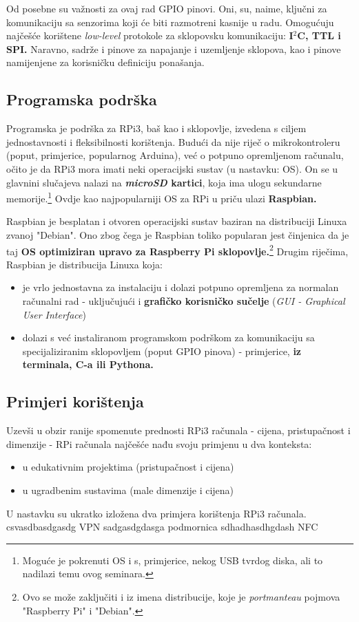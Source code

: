 \documentclass[12pt,a4paper]{article}
\begin{document}
		\par Od posebne su važnosti za ovaj rad GPIO pinovi. Oni, su, naime, ključni za komunikaciju sa senzorima koji će biti razmotreni kasnije u radu. Omogućuju najčešće korištene \textit{low-level} protokole za sklopovsku komunikaciju: \textbf{I$^2$C, TTL i SPI.} Naravno, sadrže i pinove za napajanje i uzemljenje sklopova, kao i pinove namijenjene za korisničku definiciju ponašanja.

	\subsection{Programska podrška}
		Programska je podrška za RPi3, baš kao i sklopovlje, izvedena s ciljem jednostavnosti i fleksibilnosti korištenja. Budući da nije riječ o mikrokontroleru (poput, primjerice, popularnog Arduina), već o potpuno opremljenom računalu, očito je da RPi3 mora imati neki operacijski sustav (u nastavku: OS). On se u glavnini slučajeva nalazi na \textbf{\textit{microSD} kartici}, koja ima ulogu sekundarne memorije.\footnote{Moguće je pokrenuti OS i s, primjerice, nekog USB tvrdog diska, ali to nadilazi temu ovog seminara.} Ovdje kao najpopularniji OS za RPi u priču ulazi \textbf{Raspbian.} \\

		\par Raspbian je besplatan i otvoren operacijski sustav baziran na distribuciji Linuxa zvanoj "Debian". Ono zbog čega je Raspbian toliko popularan jest činjenica da je taj \textbf{OS optimiziran upravo za Raspberry Pi sklopovlje.}\footnote{Ovo se može zaključiti i iz imena distribucije, koje je \textit{portmanteau} pojmova "Raspberry Pi" i "Debian".} Drugim riječima, Raspbian je distribucija Linuxa koja:
		\begin{itemize}
			\item je vrlo jednostavna za instalaciju i dolazi potpuno opremljena za normalan računalni rad - uključujući i \textbf{grafičko korisničko sučelje} (\textit{GUI - Graphical User Interface}) 
			\item dolazi s već instaliranom programskom podrškom za komunikaciju sa specijaliziranim sklopovljem (poput GPIO pinova) - primjerice, \textbf{iz terminala, C-a ili Pythona.}
		\end{itemize}


	\subsection{Primjeri korištenja}
	Uzevši u obzir ranije spomenute prednosti RPi3 računala - cijena, pristupačnost i dimenzije - RPi računala najčešće nađu svoju primjenu u dva konteksta:
	\begin{itemize}
		\item u edukativnim projektima (pristupačnost i cijena)
		\item u ugradbenim sustavima (male dimenzije i cijena)
	\end{itemize}
	U nastavku su ukratko izložena dva primjera korištenja RPi3 računala. csvasdbasdgasdg VPN sadgasdgdasga podmornica sdhadhasdhgdash NFC
	\\
\end{document}
